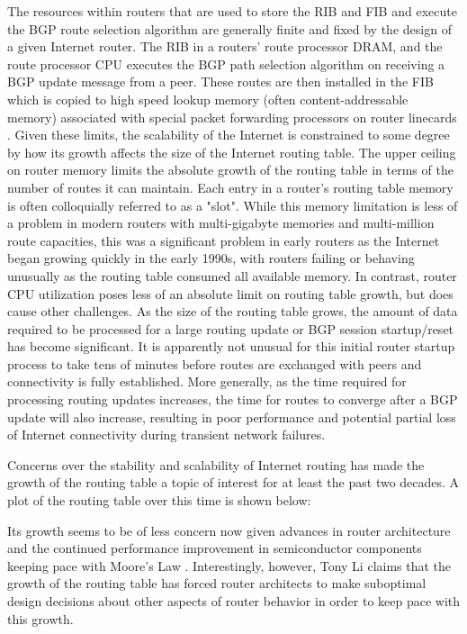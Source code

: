 The resources within routers that are used to store the RIB and FIB and execute the BGP route selection algorithm are generally finite and fixed by the design of a given Internet router. The RIB in a routers' route processor DRAM, and the route processor CPU executes the BGP path selection algorithm on receiving a BGP update message from a peer. These routes are then installed in the FIB which is copied to high speed lookup memory (often content-addressable memory) associated with special packet forwarding processors on router linecards \cite{}. Given these limits, the scalability of the Internet is constrained to some degree by how its growth affects the size of the Internet routing table. The upper ceiling on router memory limits the absolute growth of the routing table in terms of the number of routes it can maintain. Each entry in a router's routing table memory is often colloquially referred to as a "slot". While this memory limitation is less of a problem in modern routers with multi-gigabyte memories and multi-million route capacities, this was a significant problem in early routers as the Internet began growing quickly in the early 1990s, with routers failing or behaving unusually as the routing table consumed all available memory. In contrast, router CPU utilization poses less of an absolute limit on routing table growth, but does cause other challenges. As the size of the routing table grows, the amount of data required to be processed for a large routing update or BGP session startup/reset has become significant. It is apparently not unusual for this initial router startup process to take tens of minutes \cite{Steenbergen:2010nx} before routes are exchanged with peers and connectivity is fully established. More generally, as the time required for processing routing updates increases, the time for routes to converge after a BGP update will also increase, resulting in poor performance and potential partial loss of Internet connectivity during transient network failures.

Concerns over the stability and scalability of Internet routing has made the growth of the routing table a topic of interest for at least the past two decades. A plot of the routing table over this time is shown below:


Its growth seems to be of less concern now given advances in router architecture and the continued performance improvement in semiconductor components keeping pace with Moore's Law \cite{McKeown:2006kx}. Interestingly, however, Tony Li claims that the growth of the routing table has forced router architects to make suboptimal design decisions about other aspects of router behavior in order to keep pace with this growth.

